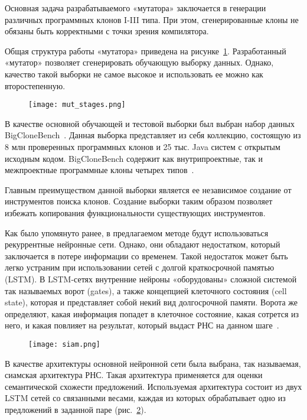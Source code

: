 Основная задача разрабатываемого «мутатора» заключается в генерации различных программных клонов I-III типа. При этом, сгенерированные клоны не обязаны быть корректными с точки зрения компилятора.

Общая структура работы «мутатора» приведена на рисунке~\ref{fig:mut_stages}. Разработанный «мутатор» позволяет сгенерировать обучающую выборку данных. Однако, качество такой выборки не самое высокое и использовать ее можно как второстепенную.

\begin{figure}[htbp]
\centering
\texttt{[image: mut\_stages.png]}
\caption{}
\label{fig:mut_stages}
\end{figure}

В качестве основной обучающей и тестовой выборки был выбран набор данных BigCloneBench~\cite{bcb}. Данная выборка представляет из себя коллекцию, состоящую из 8 млн проверенных программных клонов и 25 тыс. Java систем с открытым исходным кодом. BigCloneBench содержит как внутрипроектные, так и межпроектные программные клоны четырех типов~\cite{bcb}.

Главным преимуществом данной выборки является ее независимое создание от инструментов поиска клонов. Создание выборки таким образом позволяет избежать копирования функциональности существующих инструментов. 

Как было упомянуто ранее, в предлагаемом методе будут использоваться рекуррентные нейронные сети. Однако, они обладают недостатком, который заключается в потере информации со временем. Такой недостаток может быть легко устраним при использовании сетей с долгой краткосрочной памятью (LSTM). В LSTM-сетях внутренние нейроны «оборудованы» сложной системой так называемых ворот (gates), а также концепцией клеточного состояния (cell state), которая и представляет собой некий вид долгосрочной памяти. Ворота же определяют, какая информация попадет в клеточное состояние, какая сотрется из него, и какая повлияет на результат, который выдаст РНС на данном шаге~\cite{siam}.


\begin{figure}[htbp]
\centering
\texttt{[image: siam.png]}
\caption{}
\label{fig:siam_mod}
\end{figure}

В качестве архитектуры основной нейронной сети была выбрана, так называемая, сиамская архитектура РНС. Такая архитектура применяется для оценки семантической схожести предложений. Используемая архитектура состоит из двух LSTM сетей со связанными весами, каждая из которых обрабатывает одно из предложений в заданной паре (рис.~\ref{fig:siam_mod}). 


